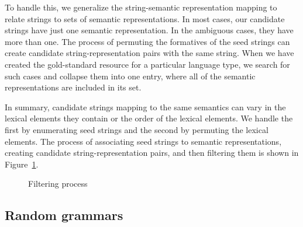 \documentclass[11pt]{article}
\begin{document}

%
To handle this, we generalize the string-semantic representation mapping
to relate strings to sets of semantic representations.  In most cases,
our candidate strings have just one semantic representation.  In the
ambiguous cases, they have more than one.  The process of permuting
the formatives of the seed strings can create candidate string-representation
pairs with the same string.  When we have created the gold-standard resource
for a particular language type, we search for such cases and collapse them
into one entry, where all of the semantic representations are included in
its set.

In summary, candidate strings mapping to the same semantics can vary
in the lexical elements they contain or the order of the lexical
elements.  We handle the first by enumerating seed strings and the
second by permuting the lexical elements.  The process of associating
seed strings to semantic representations, creating candidate
string-representation pairs, and then filtering them is shown in
Figure~\ref{filter_fig}.

\begin{figure}[ht]
\begin{center}
\end{center}
\caption{Filtering process}
\label{filter_fig}
\end{figure}

\subsection{Random grammars}
\end{document}

